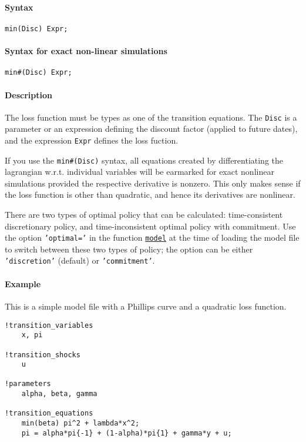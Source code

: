 


	\paragraph{Syntax}

\begin{verbatim}
min(Disc) Expr;
\end{verbatim}

\paragraph{Syntax for exact non-linear
simulations}

\begin{verbatim}
min#(Disc) Expr;
\end{verbatim}

\paragraph{Description}

The loss function must be types as one of the transition equations. The
\texttt{Disc} is a parameter or an expression defining the discount
factor (applied to future dates), and the expression \texttt{Expr}
defines the loss fuction.

If you use the \texttt{min\#(Disc)} syntax, all equations created by
differentiating the lagrangian w.r.t. individual variables will be
earmarked for exact nonlinear simulations provided the respective
derivative is nonzero. This only makes sense if the loss function is
other than quadratic, and hence its derivatives are nonlinear.

There are two types of optimal policy that can be calculated:
time-consistent discretionary policy, and time-inconsistent optimal
policy with commitment. Use the option \texttt{'optimal='} in the
function \href{model/model}{\texttt{model}} at the time of loading the
model file to switch between these two types of policy; the option can
be either \texttt{'discretion'} (default) or \texttt{'commitment'}.

\paragraph{Example}

This is a simple model file with a Phillips curve and a quadratic loss
function.

\begin{verbatim}
!transition_variables
    x, pi

!transition_shocks
    u

!parameters
    alpha, beta, gamma

!transition_equations
    min(beta) pi^2 + lambda*x^2;
    pi = alpha*pi{-1} + (1-alpha)*pi{1} + gamma*y + u;
\end{verbatim}


